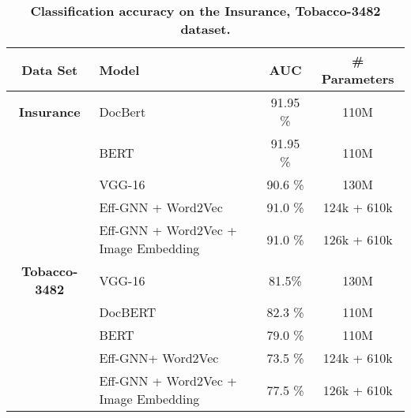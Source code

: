 \documentclass[letterpaper]{article}
\begin{document}
\begin{table*}[ht]
\centering
\begin{tabular}{clcc}
\toprule
     \textbf{Data Set} &  \textbf{\hspace{70pt} Model} &  \textbf{AUC} & \textbf{\# Parameters}\\
\midrule
 \textbf{Insurance} & DocBert \cite{DOCBERT} & 91.95 \% & 110M \\
             & BERT \cite{BERT} & 91.95  \% & 110M \\
             & VGG-16 \cite{VGG16}  & 90.6  \% & 130M\\
& Eff-GNN + Word2Vec \cite{word2vec} & 91.0 \% & 124k + 610k\\
             & Eff-GNN + Word2Vec \cite{word2vec} + Image Embedding & 91.0 \% & 126k + 610k\\
\addlinespace[1ex]
            \hline
            \hline
            \addlinespace[2ex]

     \textbf{Tobacco-3482} & VGG-16 \cite{VGG16} & 81.5\% & 130M \\
             & DocBERT \cite{DOCBERT} & 82.3 \% & 110M  \\
             & BERT \cite{BERT} & 79.0 \% & 110M \\
             & Eff-GNN+ Word2Vec \cite{word2vec} & 73.5  \% & 124k + 610k\\
             &Eff-GNN + Word2Vec \cite{word2vec} + Image Embedding & 77.5  \%& 126k + 610k\\
\bottomrule
\end{tabular}
\caption{\textbf{Classification accuracy on the Insurance, Tobacco-3482 dataset.}}
\label{effgnn_results_accuracy}
\end{table*}
\end{document}
